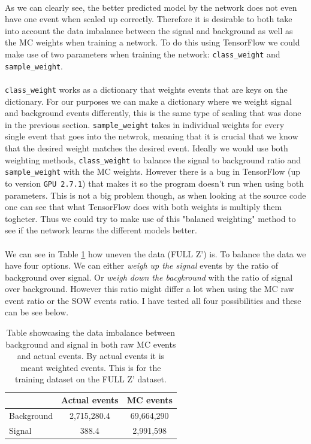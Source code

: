 \documentclass[14pt, a4paper]{book}
\begin{document}
\\As we can clearly see, the better predicted model by the network does not even have one event when scaled up correctly. Therefore it is desirable to both take into account the data imbalance between the signal and background as well as the MC weights when training a network. To do this using TensorFlow we could make use of two parameters when training the network: \verb|class_weight| and \verb|sample_weight|.
\\\\\verb|class_weight| works as a dictionary that weights events that are keys on the dictionary. For our purposes we can make a dictionary where we weight signal and background events differently, this is the same type of scaling that was done in the previous section. 
\verb|sample_weight| takes in individual weights for every single event that goes into the netwrok, meaning that it is crucial that we know that the desired weight matches the desired event. Ideally we would use both weighting methods, \verb|class_weight| to balance the signal to background ratio and \verb|sample_weight| with the MC weights. 
However there is a bug in TensorFlow (up to version \verb|GPU 2.7.1|) that makes it so the program doesn't run when using both parameters. This is not a big problem though, as when looking at the source code one can see that what TensorFlow does with both weights is multiply them togheter. Thus we could try to make use of this "balaned weighting" method to see if the network learns the different models better.\\
\\We can see in Table \ref{tab:MC_imbalance} how uneven the data (FULL Z') is. To balance the data we have four options. We can either \textit{weigh up the signal} events by the ratio of background over signal. Or \textit{weigh down the bacgkround} with the ratio of signal over background. However this ratio might differ a lot when using the MC raw event ratio or the SOW events ratio. I have tested all four possibilities and these can be see below.\\
\begin{table}[!h]
   \centering
   \begin{tabular}{l|c|c}\midrule\midrule
                        & Actual events   & MC events \\\midrule
         Background     & 2,715,280.4     & 69,664,290  \\
         Signal         & 388.4           & 2,991,598   \\\midrule\midrule
   \end{tabular}
   \caption[Imbalance raw events and SOW]{Table showcasing the data imbalance between background and signal in both raw MC events and actual events. By actual events it is meant weighted events. This is for the training dataset on the FULL Z' dataset.}
   \label{tab:MC_imbalance}
\end{table}
\end{document}
